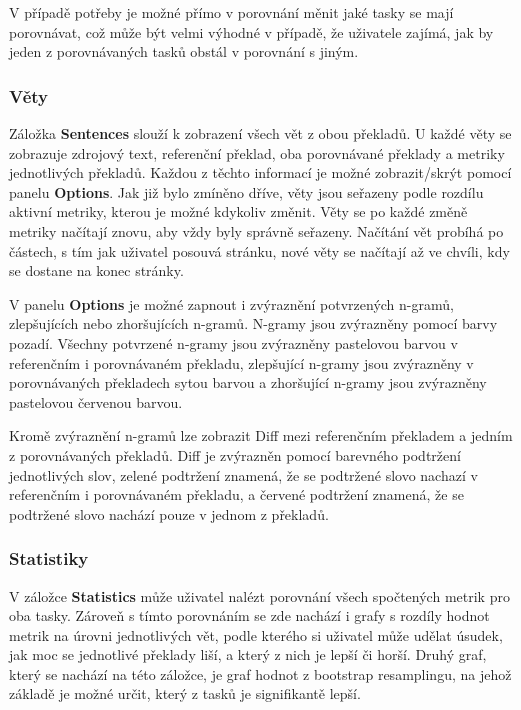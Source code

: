 V případě potřeby je možné přímo v porovnání měnit jaké tasky se mají porovnávat,
  což může být velmi výhodné v případě,
  že uživatele zajímá,
  jak by jeden z porovnávaných tasků obstál v porovnání s jiným.

\subsubsection{Věty}
Záložka \textbf{Sentences} slouží k zobrazení všech vět z obou překladů.
U každé věty se zobrazuje zdrojový text,
  referenční překlad, oba porovnávané překlady
  a metriky jednotlivých překladů.
Každou z těchto informací je možné zobrazit/skrýt pomocí panelu \textbf{Options}.
Jak již bylo zmíněno dříve,
  věty jsou seřazeny podle rozdílu aktivní metriky,
  kterou je možné kdykoliv změnit.
Věty se po každé změně metriky načítají znovu,
  aby vždy byly správně seřazeny.
Načítání vět probíhá po částech,
  s tím jak uživatel posouvá stránku,
  nové věty se načítají až ve chvíli,
  kdy se dostane na konec stránky.

V panelu \textbf{Options} je možné zapnout i zvýraznění potvrzených \mbox{n-gramů}, zlepšujících nebo zhoršujících \mbox{n-gramů}.
N-gramy jsou zvýrazněny pomocí barvy pozadí.
Všechny potvrzené \mbox{n-gramy} jsou zvýrazněny pastelovou barvou v referenčním i porovnávaném překladu,
  zlepšující \mbox{n-gramy} jsou zvýrazněny v porovnávaných překladech sytou barvou
  a zhoršující \mbox{n-gramy} jsou zvýrazněny pastelovou červenou barvou.

Kromě zvýraznění \mbox{n-gramů} lze zobrazit Diff mezi referenčním překladem a jedním z porovnávaných překladů.
Diff je zvýrazněn pomocí barevného podtržení jednotlivých slov,
  zelené podtržení znamená, že se podtržené slovo nachazí v referenčním i porovnávaném překladu,
  a červené podtržení znamená, že se podtržené slovo nachází pouze v jednom z překladů.

\subsubsection{Statistiky}
V záložce \textbf{Statistics} může uživatel nalézt porovnání všech spočtených metrik pro oba tasky.
Zároveň s tímto porovnáním se zde nachází i grafy s rozdíly hodnot metrik na úrovni jednotlivých vět,
  podle kterého si uživatel může udělat úsudek,
  jak moc se jednotlivé překlady liší,
  a který z nich je lepší či horší.
Druhý graf, který se nachází na této záložce,
  je graf hodnot z bootstrap resamplingu,
  na jehož základě je možné určit,
  který z tasků je signifikantě lepší.

